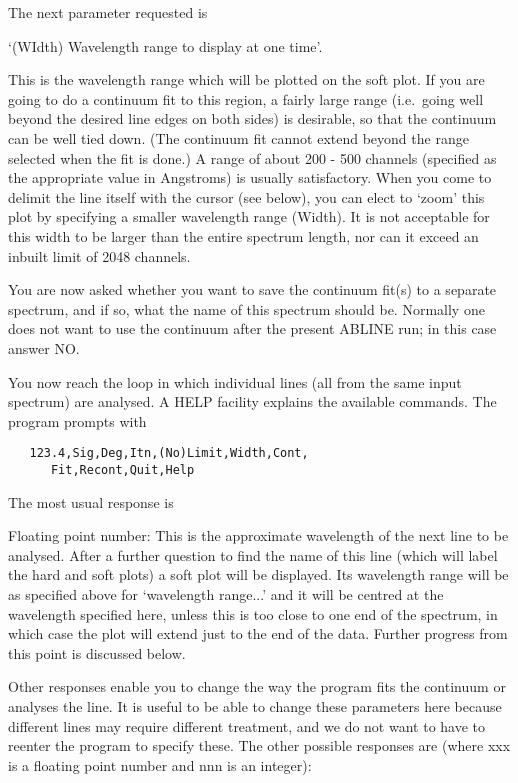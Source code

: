 The next parameter requested is 

`(WIdth) Wavelength range to display at one time'.

This is the wavelength range which will be plotted on the soft plot.  If you
are going to do a continuum fit to this region, a fairly large range (i.e.\
going well beyond the desired line edges on both sides) is desirable, so that
the continuum can be well tied down.  (The continuum fit cannot extend beyond
the range selected when the fit is done.)  A range of about 200 - 500 channels
(specified as the appropriate value in Angstroms) is usually satisfactory. 
When you come
to delimit the line itself with the cursor (see below), you can elect to
`zoom' this plot by specifying a smaller wavelength range (Width). It is not
acceptable for this width to be larger than the entire spectrum length, nor
can it exceed an inbuilt limit of 2048 channels. 

You are now asked whether you want to save the continuum fit(s) to a separate
spectrum, and if so, what the name of this spectrum should be. Normally one
does not want to use the continuum after the present ABLINE run; in this case
answer NO.

You now reach the loop in which individual lines (all from the same input 
spectrum) are analysed. A HELP facility explains the available commands.
The program prompts with

\begin{verbatim}
   123.4,Sig,Deg,Itn,(No)Limit,Width,Cont,
      Fit,Recont,Quit,Help
\end{verbatim}

The most usual response is

Floating point number: This is the approximate wavelength of the next 
line to be analysed. After a further question to find the name of this line 
(which will label the hard and soft plots) a soft plot will be displayed. 
Its wavelength range will be as specified above for `wavelength range...'
and it will be centred at the wavelength specified here, unless this is 
too close to one end of the spectrum, in which case the plot will extend 
just to the end of the data. Further progress from this point is discussed 
below.

Other responses enable you to change the way the program fits the 
continuum or analyses the line. It is useful to be able to change these 
parameters here because different lines may require different treatment, 
and we do not want to have to reenter the program to specify these. The 
other possible responses are (where xxx is a floating point number and nnn 
is an integer):

